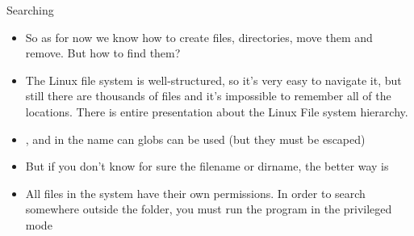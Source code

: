 \documentclass[usenames,dvipsnames,10pt,aspectratio=169]{beamer}
\begin{document}
\begin{frame}{Searching}
    \begin{itemize}
        \item So as for now we know how to create files, directories, move them and remove. But how to find them?
        \item The Linux file system is well-structured, so it's very easy to navigate it, but still there are thousands of files and it's impossible to remember all of the locations. There is entire presentation about the Linux File system hierarchy.
        \item {}, and in the name can globs can be used (but they must be escaped)
        \item But if you don't know for sure the filename or dirname, the better way is 
        \item {} All files in the system have their own permissions. In order to search somewhere outside the  folder, you must run the program in the privileged mode
        
    \end{itemize}
\end{frame}
\end{document}

